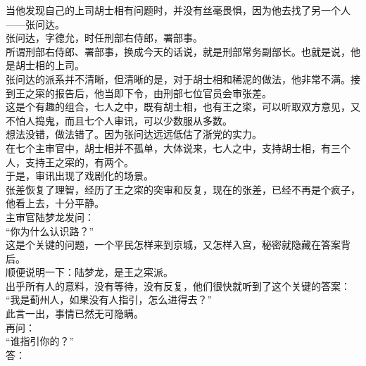 \begin{multicols}{\theparacolNo}
当他发现自己的上司胡士相有问题时，并没有丝毫畏惧，因为他去找了另一个人——张问达。\\

张问达，字德允，时任刑部右侍郎，署部事。\\

所谓刑部右侍郎、署部事，换成今天的话说，就是刑部常务副部长。也就是说，他是胡士相的上司。\\

张问达的派系并不清晰，但清晰的是，对于胡士相和稀泥的做法，他非常不满。接到王之寀的报告后，他当即下令，由刑部七位官员会审张差。\\

这是个有趣的组合，七人之中，既有胡士相，也有王之寀，可以听取双方意见，又不怕人捣鬼，而且七个人审讯，可以少数服从多数。\\

想法没错，做法错了。因为张问达远远低估了浙党的实力。\\

在七个主审官中，胡士相并不孤单，大体说来，七人之中，支持胡士相，有三个人，支持王之寀的，有两个。\\

于是，审讯出现了戏剧化的场景。\\

张差恢复了理智，经历了王之寀的突审和反复，现在的张差，已经不再是个疯子，他看上去，十分平静。\\

主审官陆梦龙发问：\\

“你为什么认识路？”\\

这是个关键的问题，一个平民怎样来到京城，又怎样入宫，秘密就隐藏在答案背后。\\

顺便说明一下：陆梦龙，是王之寀派。\\

出乎所有人的意料，没有等待，没有反复，他们很快就听到了这个关键的答案：\\

“我是蓟州人，如果没有人指引，怎么进得去？”\\

此言一出，事情已然无可隐瞒。\\

再问：\\

“谁指引你的？”\\

答：\\


\end{multicols}
